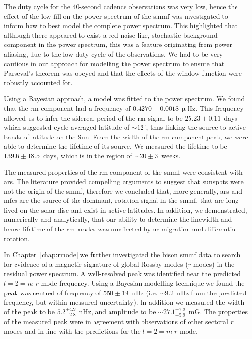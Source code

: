 The duty cycle for the 40-second cadence observations was very low, hence the effect of the low fill on the power spectrum of the \gls{smmf} was investigated to inform how to best model the complete power spectrum. This highlighted that although there appeared to exist a red-noise-like, stochastic background component in the power spectrum, this was a feature originating from power aliasing, due to the low duty cycle of the observations. We had to be very cautious in our approach for modelling the power spectrum to ensure that Parseval's theorem was obeyed and that the effects of the window function were robustly accounted for.

Using a Bayesian approach, a model was fitted to the power spectrum. We found that the \gls{rm} component had a frequency of $0.4270\pm0.0018\,\upmu\mathrm{Hz}$. This frequency allowed us to infer the sidereal period of the \gls{rm} signal to be $25.23\pm0.11$~days which suggested cycle-averaged latitude of $\sim 12^{\circ}$, thus linking the source to active bands of latitude on the Sun. From the width of the \gls{rm} component peak, we were able to determine the lifetime of its source. We measured the lifetime to be $139.6\pm18.5$~days, which is in the region of $\sim20\pm3$~weeks.

The measured properties of the \gls{rm} component of the \gls{smmf} were consistent with \glspl{ar}. The literature provided compelling arguments to suggest that sunspots were not the origin of the \gls{smmf}, therefore we concluded that, more generally, \glspl{ar} and \glspl{mfc} are the source of the dominant, rotation signal in the \gls{smmf}, that are long-lived on the solar disc and exist in active latitudes. In addition, we demonstrated, numerically and analytically, that our ability to determine the linewidth and hence lifetime of the \gls{rm} modes was unaffected by \gls{ar} migration and differential rotation.


In Chapter~\ref{chap:rmode} we further investigated the \gls{bison} \gls{smmf} data to search for evidence of a magnetic signature of global Rossby modes ($r$ modes) in the residual power spectrum. A well-resolved peak was identified near the predicted $l=2=m$ $r$ mode frequency. Using a Bayesian modelling technique we found the peak was centred of frequency of $550\pm19$~nHz (i.e. $\sim9.2$~nHz from the predicted frequency, but within measured uncertainty). In addition we measured the width of the peak to be $5.2^{+4.9}_{-2.8}$~nHz, and amplitude to be $\sim 27.1^{+7.9}_{-5.9}$~mG. The properties of the measured peak were in agreement with observations of other sectoral $r$ modes and in-line with the predictions for the $l=2=m$ $r$ mode.

